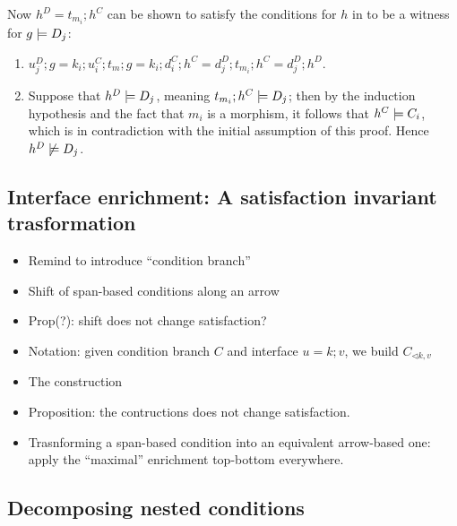 Now $h^D=t_{m_i};h^C$ can be shown to satisfy the conditions for $h$ in  to be a witness for $g\models D_j$:
\begin{enumerate}
\item $u_j^D;g = k_i;u_i^C;t_m;g= k_i;d_i^C;h^C = d_j^D;t_{m_i};h^C=d_j^D;h^D$.
\item Suppose that $h^D\models D_j$, meaning $t_{m_i};h^C\models D_j$; then by the induction hypothesis and the fact that $m_i$ is a morphism, it follows that $h^C\models C_i$, which is in contradiction with the initial assumption of this proof. Hence $h^D\not\models D_j$.
\end{enumerate}
%
\subsection{Interface enrichment: A satisfaction invariant trasformation}

\begin{itemize}
  \item Remind to introduce ``condition branch''
  \item Shift of span-based conditions along an arrow
  \item Prop(?): shift does not change satisfaction?
  \item Notation: given condition branch $C$ and interface $u = k;v$, we build $C_{\triangleleft k, v}$
  \item The construction
  \item Proposition: the contructions does not change satisfaction.
  \item Trasnforming a span-based condition into an equivalent arrow-based one: apply the ``maximal'' enrichment top-bottom everywhere.
\end{itemize}  


\subsection{Decomposing nested conditions}


